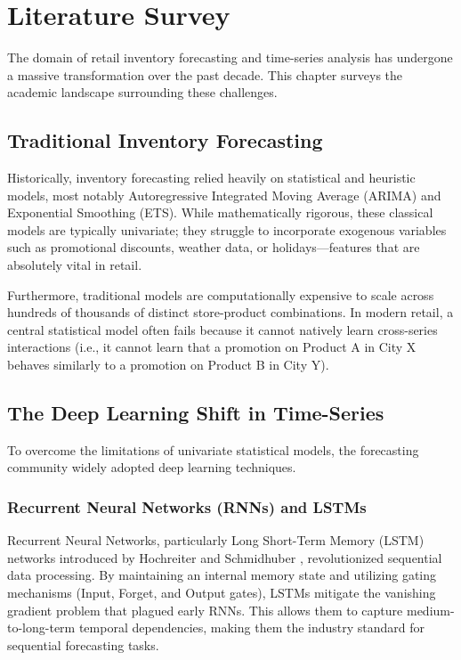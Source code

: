 \chapter{Literature Survey}
\label{chap:l_survey}

The domain of retail inventory forecasting and time-series analysis has undergone a massive transformation over the past decade. This chapter surveys the academic landscape surrounding these challenges.

\section{Traditional Inventory Forecasting}

Historically, inventory forecasting relied heavily on statistical and heuristic models, most notably Autoregressive Integrated Moving Average (ARIMA) and Exponential Smoothing (ETS). While mathematically rigorous, these classical models are typically univariate; they struggle to incorporate exogenous variables such as promotional discounts, weather data, or holidays—features that are absolutely vital in retail. 

Furthermore, traditional models are computationally expensive to scale across hundreds of thousands of distinct store-product combinations. In modern retail, a central statistical model often fails because it cannot natively learn cross-series interactions (i.e., it cannot learn that a promotion on Product A in City X behaves similarly to a promotion on Product B in City Y).

\section{The Deep Learning Shift in Time-Series}

To overcome the limitations of univariate statistical models, the forecasting community widely adopted deep learning techniques. 

\subsection{Recurrent Neural Networks (RNNs) and LSTMs}
Recurrent Neural Networks, particularly Long Short-Term Memory (LSTM) networks introduced by Hochreiter and Schmidhuber \cite{hochreiter1997long}, revolutionized sequential data processing. By maintaining an internal memory state and utilizing gating mechanisms (Input, Forget, and Output gates), LSTMs mitigate the vanishing gradient problem that plagued early RNNs. This allows them to capture medium-to-long-term temporal dependencies, making them the industry standard for sequential forecasting tasks.

